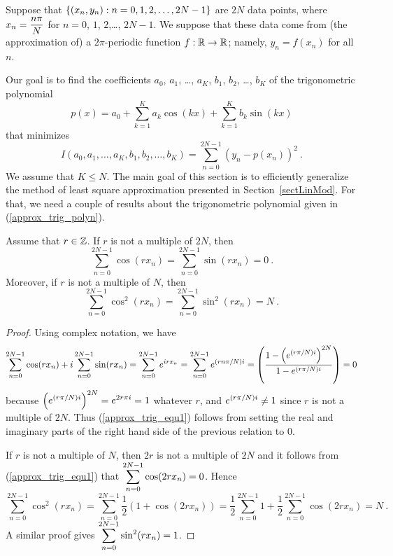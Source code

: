 Suppose that
$\displaystyle \left\{ (x_n,y_n) : n=0,1,2,\ldots, 2N-1\right\}$ are $2N$
data points, where
$\displaystyle x_n = \frac{n \pi}{N}$ for $n=0$, $1$, $2$,\ldots, $2N-1$.
We suppose that these data come from (the approximation of) a
$2\pi$-periodic function $f:\mathbb{R}\rightarrow \mathbb{R}$; namely, $y_n = f(x_n)$
for all $n$.

Our goal is to find the coefficients $a_0$, $a_1$, \ldots, $a_K$, $b_1$,
$b_2$, \ldots, $b_K$ of the trigonometric polynomial
\begin{equation} \label{approx_trig_polyn}
p(x) = a_0 + \sum_{k=1}^{K} a_k \cos(k x) + \sum_{k=1}^{K} b_k \sin(k x)
\end{equation}
that minimizes
\[
I(a_0,a_1,\ldots,a_K,b_1,b_2,\ldots,b_K) =
\sum_{n=0}^{2N-1} \left( y_n - p(x_n) \right)^2 \ .
\]
We assume that $K\leq N$.  The main goal of this section is to
efficiently generalize the method of least square approximation
presented in Section~\ref{sectLinMod}.  For that, we need a couple of
results about the trigonometric polynomial given in
(\ref{approx_trig_polyn}).

\begin{lemma}
Assume that $r \in \mathbb{Z}$.  If $r$ is not a multiple of $2N$, then
\begin{equation} \label{approx_trig_equ1}
\sum_{n=0}^{2N-1} \cos(r x_n) = \sum_{n=0}^{2N-1} \sin(r x_n) = 0 \ .
\end{equation}
Moreover, if $r$ is not a multiple of $N$, then
\begin{equation}  \label{approx_trig_equ2}
\sum_{n=0}^{2N-1} \cos^2(r x_n) = \sum_{n=0}^{2N-1} \sin^2(r x_n) = N \ .
\end{equation}
\label{approx_trig_realSP}
\end{lemma}

\begin{proof}
Using complex notation, we have
\[
\sum_{n=0}^{2N-1} \cos(r x_n) + i \sum_{n=0}^{2N-1} \sin(r x_n) =
\sum_{n=0}^{2N-1} e^{i r x_n}
= \sum_{n=0}^{2N-1} e^{(r n \pi/N)i}
= \left(\frac{\displaystyle 1- \left(e^{(r \pi/N)i}\right)^{2N}}
{1 - e^{(r \pi/N)i}}\right) = 0
\]
because $\displaystyle \left(e^{(r \pi/N)i}\right)^{2N} = e^{2 r \pi i} = 1$
whatever $r$, and $\displaystyle e^{(r \pi/N)i} \neq 1$ since $r$ is
not a multiple of $2N$.  Thus (\ref{approx_trig_equ1}) follows from
setting the real and imaginary parts of the right hand side of the
previous relation to $0$.

If $r$ is not a multiple of $N$, then $2r$ is not a multiple of $2N$
and it follows from (\ref{approx_trig_equ1}) that
$\displaystyle \sum_{n=0}^{2N-1} \cos(2r x_n) = 0$.  Hence
\[
\sum_{n=0}^{2N-1} \cos^2(r x_n)
= \sum_{n=0}^{2N-1} \frac{1}{2} \left( 1 + \cos(2r x_n)\right)
= \frac{1}{2} \sum_{n=0}^{2N-1} 1 + \frac{1}{2} \sum_{n=0}^{2N-1} \cos(2r x_n)
= N \ .
\]
A similar proof gives $\displaystyle \sum_{n=0}^{2N-1} \sin^2(r x_n) = 1$.
\end{proof}

